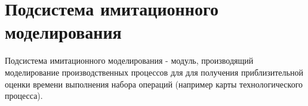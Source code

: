 \section{Подсистема имитационного моделирования}
\indent Подсистема имитационного моделирования - модуль, производящий моделирование производственных процессов для для получения приблизительной оценки времени выполнения набора операций (например карты технологического процесса).
